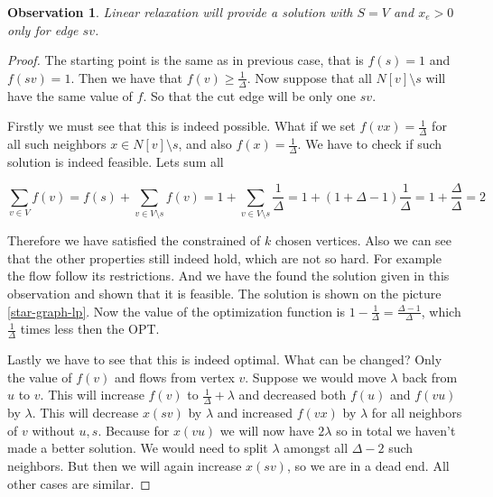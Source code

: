 \documentclass{article}
\theoremstyle{plain}
\newtheorem{observ}[thm]{Observation}
\theoremstyle{plain}
\theoremstyle{remark}
\begin{document}
	\begin{observ}
		Linear relaxation will provide a solution with $S = V$ and $x_e > 0$ only for edge $sv$. 
	\end{observ}

	\begin{proof}
		The starting point is the same as in previous case, that is $f(s) = 1$ and $f(sv) = 1$. Then we have that $f(v) \geq \frac{1}{\Delta}$. Now suppose that all $N[v] \setminus s$ will have the same value of $f$. So that the cut edge will be only one $sv$.
		
		Firstly we must see that this is indeed possible. What if we set $f(vx) = \frac{1}{\Delta}$ for all such neighbors $x \in N[v] \setminus s$, and also $f(x) = \frac{1}{\Delta}$. We have to check if such solution is indeed feasible. Lets sum all
		
		$$
		\sum_{v \in V} f(v) = f(s) + \sum_{v \in V \setminus s} f(v) = 1 + \sum_{v \in V \setminus s} \frac{1}{\Delta} = 1 + (1 + \Delta - 1) \frac{1}{\Delta} = 1 + \frac{\Delta}{\Delta} = 2
		$$
		
		Therefore we have satisfied the constrained of $k$ chosen vertices. Also we can see that the other properties still indeed hold, which are not so hard. For example the flow follow its restrictions. And we have the found the solution given in this observation and shown that it is feasible. The solution is shown on the picture \ref{star-graph-lp}. Now the value of the optimization function is $1 - \frac{1}{\Delta} = \frac{\Delta - 1}{\Delta}$, which $\frac{1}{\Delta}$ times less then the OPT.
		
		Lastly we have to see that this is indeed optimal. What can be changed? Only the value of $f(v)$ and flows from vertex $v$. Suppose we would move $\lambda$ back from $u$ to $v$. This will increase $f(v)$ to $\frac{1}{\Delta} + \lambda$ and decreased both $f(u)$ and $f(vu)$ by $\lambda$. This will decrease $x(sv)$ by $\lambda$ and increased $f(vx)$ by $\lambda$ for all neighbors of $v$ without $u,s$. Because for $x(vu)$ we will now have $2 \lambda$ so in total we haven't made a better solution. We would need to split $\lambda$ amongst all $\Delta -2$ such neighbors. But then we will again increase $x(sv)$, so we are in a dead end. All other cases are similar.
	\end{proof}
\end{document}
